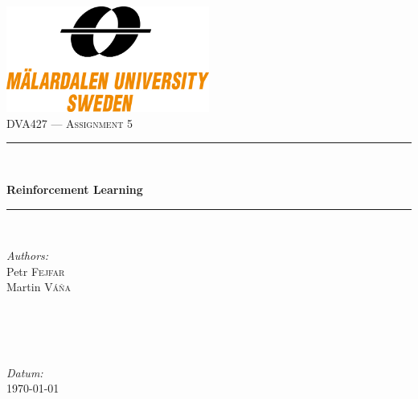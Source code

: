 \documentclass[12pt,a4paper]{article}
\begin{document}

\begin{titlepage}

\newcommand{\HRule}{\rule{\linewidth}{0.5mm}} %

\center %

\includegraphics[width=0.5\textwidth]{mdh_logo}~\\[2cm] %

\textsc{\Large DVA427 --- Assignment 5}\\[0cm]


\HRule \\[0.8cm]
\begin{center}
 \Huge \bfseries Reinforcement Learning\\[0.4cm] %
\end{center}
\HRule \\[0.5cm]

\vspace{\fill}

\begin{minipage}{0.4\textwidth}
\begin{flushleft} \large
\emph{Authors:}\\
Petr \textsc{Fejfar}\\[0.2cm] %
Martin \textsc{Váňa}\\[0.2cm] %
\end{flushleft}
\end{minipage}
~
\begin{minipage}{0.4\textwidth}
\begin{flushright} \large
~\\
~\\
\emph{Datum:} \\
\today\\[0.2cm] %
\end{flushright}
\end{minipage}\\

\end{titlepage}
\end{document}
